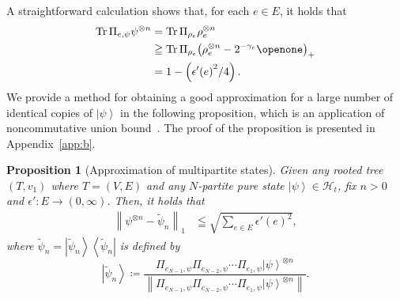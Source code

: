 \documentclass[preprintnumbers,aps,amsmath,amssymb,pra,twocolumn,showpacs,superscriptaddress,floatfix]{revtex4-1}
\def\Bra#1{\left\langle#1\right|}
\def\Ket#1{\left|#1\right\rangle}
\DeclareMathOperator{\tr}{Tr}
\theoremstyle{plain}
\newtheorem{proposition}[theorem]{Proposition}
\theoremstyle{definition}
\theoremstyle{remark}
\begin{document}
A straightforward calculation shows that, for each $e\in E$, it holds that
\begin{equation}
    \label{eq:projection}
    \begin{split}
    \tr \Pi_{e,\psi}\psi^{\otimes n} &= \tr \Pi_{\rho_e}\rho_e^{\otimes n}\\
    &\geqq\tr\Pi_{\rho_e}{\left(\rho_e^{\otimes n}-2^{-\gamma_e}\openone\right)}_+\\
    &=1-\left({\epsilon'(e)}^2/4\right).
\end{split}
\end{equation}
We provide a method for obtaining a good approximation for a large number of identical copies of $\Ket{\psi}$ in the following proposition, which is an application of noncommutative union bound~\cite{pra052331}.  The proof of the proposition is presented in Appendix~\ref{app:b}.   
\begin{proposition}[Approximation of multipartite states]
\label{prp:approximation}
Given any rooted tree $(T,v_1)$ where $T=(V,E)$ and any $N$-partite pure state $\Ket{\psi}\in\mathcal{H}_t$, fix $n > 0$ and $\epsilon'\colon E\rightarrow (0,\infty)$.
Then, it holds that
\begin{equation}
\label{eq:approximation}
\begin{split}
    \left\|\psi^{\otimes n}-\tilde\psi_n\right\| _1 &\leqq\sqrt{\sum_{e\in E}{\epsilon'(e)}^2},
\end{split}
\end{equation}
where  $\tilde\psi_n=\Ket{\tilde\psi_n}\Bra{\tilde\psi_n}$ is defined by
\begin{equation}
\label{eq:approximated_state}
\Ket{\tilde\psi_n}\coloneqq\frac{\Pi_{e_{N-1},\psi}\Pi_{e_{N-2},\psi}\cdots\Pi_{e_1,\psi}\Ket{\psi}^{\otimes n}}{\left\|\Pi_{e_{N-1},\psi}\Pi_{e_{N-2},\psi}\cdots\Pi_{e_1,\psi}\Ket{\psi}^{\otimes n}\right\|}.
\end{equation}
\end{proposition}
\end{document}
